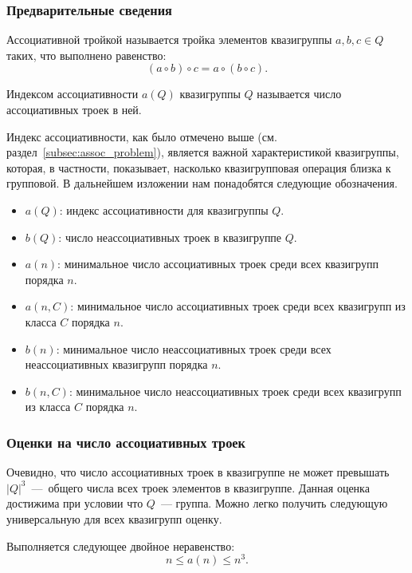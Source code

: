 \subsubsection{Предварительные сведения}

    \begin{definition}
        Ассоциативной тройкой называется тройка элементов квазигруппы $a, b, c \in Q$ таких, что выполнено равенство:
        \[
            (a \circ b) \circ c = a \circ (b \circ c).
        \]
    \end{definition}

    \begin{definition}
        Индексом ассоциативности $a(Q)$ квазигруппы $Q$ называется число ассоциативных троек в ней.
    \end{definition}

    Индекс ассоциативности, как было отмечено выше (см. раздел~\ref{subsec:assoc_problem}), является важной характеристикой квазигруппы, которая, в частности, показывает, насколько квазигрупповая операция близка к групповой.
    В дальнейшем изложении нам понадобятся следующие обозначения.
    \begin{itemize}
        \item $a(Q)$: индекс ассоциативности для квазигруппы $Q$.
        \item $b(Q)$: число неассоциативных троек в квазигруппе $Q$.
        \item $a(n)$: минимальное число ассоциативных троек среди всех квазигрупп порядка $n$.
        \item $a(n, C)$: минимальное число ассоциативных троек среди всех квазигрупп из класса $C$ порядка $n$.
        \item $b(n)$: минимальное число неассоциативных троек среди всех неассоциативных квазигрупп порядка $n$.
        \item $b(n, C)$: минимальное число неассоциативных троек среди всех квазигрупп из класса $C$ порядка $n$.
    \end{itemize}

\subsubsection{Оценки на число ассоциативных троек}

    Очевидно, что число ассоциативных троек в квазигруппе не может превышать $|Q|^3$~---~общего числа всех троек элементов в квазигруппе.
    Данная оценка достижима при условии что $Q$~--- группа.
    Можно легко получить следующую универсальную для всех квазигрупп оценку.
    \begin{proposition}
        Выполняется следующее двойное неравенство:
        \[
            n \le a(n) \le n^3.
        \]
    \end{proposition}

